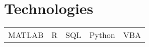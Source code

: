 \documentclass[a4paper,10pt]{article}
\begin{document}

\section{Technologies}
\begin{tabular}{l|l|l|l|l}	
MATLAB & R & SQL & Python & VBA
\end{tabular}
\end{document}
